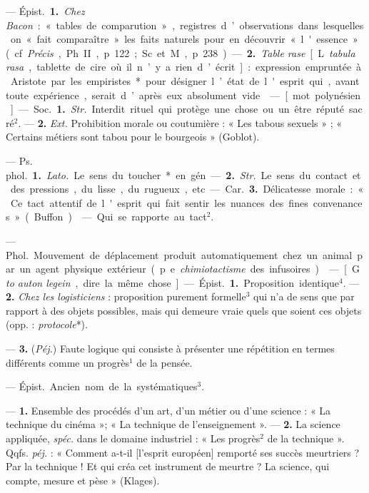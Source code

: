 
	\begin{itemize}[leftmargin=1cm, label=, itemsep=1pt]

 — \si{Épist.} {\bf 1.} {\it Chez Bacon} : « tables de comparution
», registres d’observations dans lesquelles on « fait comparaître » les faits
naturels pour en découvrir « l'essence » (cf. {\it Précis}, Ph. II, p. 122 ;
Sc. et M., p. 238). —  {\bf 2.} {\it Table rase} [L. {\it tabula rasa},
tablette de cire où il n’y a rien d’écrit] : expression empruntée à Aristote
par les empiristes* pour désigner l’état de l'esprit qui, avant toute
expérience, serait d’après eux absolument vide.

 — [mot polynésien] — \si{Soc.} {\bf 1.} {\it Str.} Interdit rituel
qui protège une chose ou un être réputé sacré$^2$. — {\bf 2.} {\it Ext.}
Prohibition morale ou coutumière : « Les tabous sexuels » ; « Certains
métiers sont tabou pour le bourgeois » (Goblot).

 — \si{Ps. phol.} {\bf 1.} {\it Lato.} Le sens du toucher* en gén. —
{\bf 2.} {\it Str.} Le sens du contact et des pressions, du lisse, du
rugueux, etc.

— \si{Car.} {\bf 3.} Délicatesse morale : « Ce tact attentif de l'esprit qui
fait sentir les nuances des fines convenances » (Buffon).

 — Qui se rapporte au tact$^2$.

 — \si{Phol.} Mouvement de déplacement produit automatiquement
chez un animal par un agent physique extérieur (p. e. {\it chimiotactisme}
des infusoires).

 — [G. {\it to auton legein}, dire la même chose] — \si{Épist.}
{\bf 1.} Proposition identique$^4$. — {\bf 2.} {\it Chez les logisticiens} :
proposition purement formelle$^3$ qui n’a de sens que par rapport à des
objets possibles, mais qui demeure vraie quels que soient ces objets (opp. :
{\it protocole}*).

— {\bf 3.} ({\it Péj.}) Faute logique qui
consiste à présenter une répétition
en termes différents comme un progrès$^1$ de la pensée.

 — \si{Épist.} Ancien nom de la systématiques$^3$.

 — {\bf 1.} Ensemble des procédés d’un art, d’un métier
ou d’une science : « La technique du cinéma »; « La technique de
l'enseignement ». — {\bf 2.} La science appliquée, {\it spéc.} dans le
domaine industriel : « Les progrès$^2$ de la technique ». Qqfs. {\it péj.} :
« Comment a-t-il [l'esprit européen] remporté ses succès meurtriers ? Par la
technique ! Et qui créa cet instrument de meurtre ? La science, qui compte,
mesure et pèse » (Klages).


\end{itemize}
